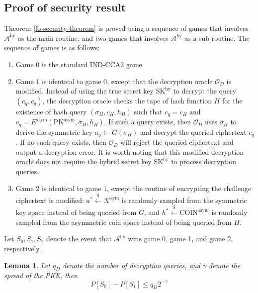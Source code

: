 \documentclass{article}
\newcommand{\leftsample}{\overset{{\scriptscriptstyle\$}}{\leftarrow}}
\newtheorem{lemma}{Lemma}[theorem]
\begin{document}
\subsection{Proof of security result}
Theorem \ref{fo-security-theorem} is proved using a sequence of games that involves $\mathcal{A}^\text{hy}$ as the main routine, and two games that involves $\mathcal{A}^\text{hy}$ as a sub-routine. The sequence of games is as follows:

\begin{enumerate}
    \item Game 0 is the standard IND-CCA2 game

    \item Game 1 is identical to game 0, except that the decryption oracle $\mathcal{O}_D$ is modified. Instead of using the true secret key $\text{SK}^\text{hy}$ to decrypt the query $(e_q, c_q)$, the decryption oracle checks the tape of hash function $H$ for the existence of hash query $(\sigma_H, c_H, h_H)$ such that $c_q = c_H$ and $e_q = E^\text{asym}(\text{PK}^\text{asym}, \sigma_H, h_H)$. If such a query exists, then $\mathcal{O}_D$ uses $\sigma_H$ to derive the symmetric key $a_q \leftarrow G(\sigma_H)$ and decrypt the queried ciphertext $c_q$. If no such query exists, then $\mathcal{O}_D$ will reject the queried ciphertext and output a decryption error. It is worth noting that this modified decryption oracle does not require the hybrid secret key $\text{SK}^\text{hy}$ to process decryption queries.

    \item Game 2 is identical to game 1, except the routine of encrypting the challenge ciphertext is modified: $a^\ast \leftsample \mathcal{K}^\text{sym}$ is randomly sampled from the symmetric key space instead of being queried from $G$, and $h^\ast \leftsample \text{COIN}^\text{asym}$ is randomly sampled from the asymmetric coin space instead of being queried from $H$.
\end{enumerate}

Let $S_0, S_1, S_2$ denote the event that $\mathcal{A}^\text{hy}$ wins game 0, game 1, and game 2, respectively.

\begin{lemma}\label{fo-win0-win1}
    Let $q_D$ denote the number of decryption queries, and $\gamma$ denote the spread of the PKE, then
    \begin{equation*}
        P[S_0] - P[S_1] \leq q_D 2^{-\gamma}
    \end{equation*}
\end{lemma}
\end{document}

